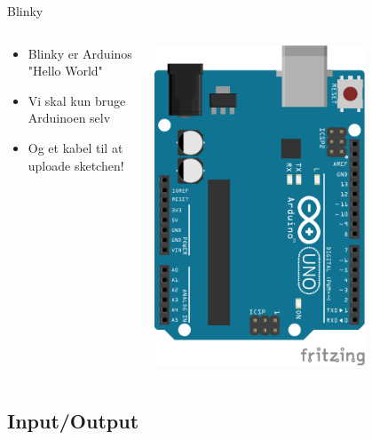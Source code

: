 \documentclass{beamer}
\begin{document}
\begin{frame}[fragile]{Blinky}
\begin{columns}
	\begin{column}{0.5\textwidth}
	\begin{itemize}
		\item{Blinky er Arduinos "Hello World"}
		\item{Vi skal kun bruge Arduinoen selv}
		\item{Og et kabel til at uploade sketchen!}
	\end{itemize}
	\end{column}
	\begin{column}{0.5\textwidth}
	\begin{center}
		\includegraphics[width=0.7\textwidth]{../Examples/1_Blinky/1_Blinky_bb.png}
	\end{center}
	\end{column}
\end{columns}
\end{frame}

\subsection{Input/Output}
\end{document}
